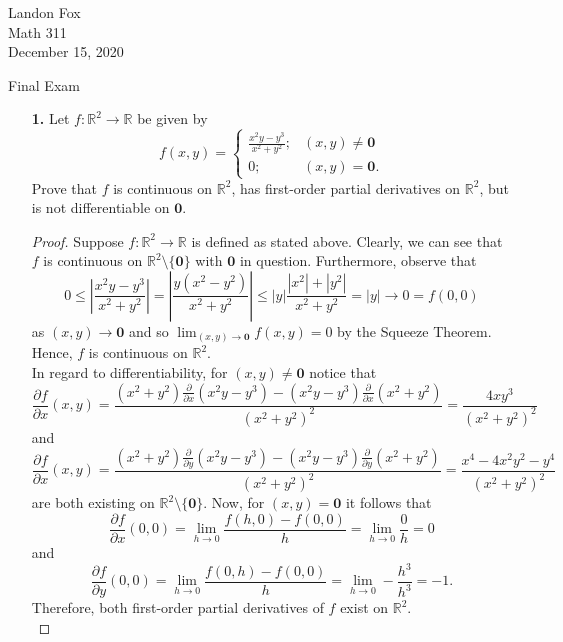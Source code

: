 \documentclass[ 12pt ]{article}
\begin{document}
\noindent Landon Fox \\
\noindent Math 311 \\
\noindent December 15, 2020

\begin{center}
	\Large Final Exam
\end{center}

\begin{enumerate}
	\item[\textbf{1.}] Let $f : \mathbb{R}^2 \to \mathbb{R}$ be given by \[ f(x, y) = \begin{cases} \frac{x^2y - y^3}{x^2 + y^2}; &(x, y) \neq \textbf{0} \\ 0; &(x, y) =
		\textbf{0}. \end{cases} \] Prove that $f$ is continuous on $\mathbb{R}^2$, has first-order partial derivatives on $\mathbb{R}^2$, but is not differentiable on
		$\textbf{0}$.

		\begin{proof}
			Suppose $f : \mathbb{R}^2 \to \mathbb{R}$ is defined as stated above. Clearly, we can see that $f$ is continuous on $\mathbb{R}^2 \setminus \{ \textbf{0} \}$ with
			$\textbf{0}$ in question. Furthermore, observe that $$0 \leq \left | \frac{x^2y - y^3}{x^2 + y^2} \right | = \left | \frac{y(x^2 - y^2)}{x^2 + y^2} \right |
			\leq |y| \frac{|x^2| + |y^2|}{x^2 + y^2} = |y| \to 0 = f(0, 0)$$ as $(x, y) \to \textbf{0}$ and so $\lim_{(x, y) \to \textbf{0}} f(x, y) = 0$ by the Squeeze
			Theorem. Hence, $f$ is continuous on $\mathbb{R}^2$. \\

			In regard to differentiability, for $(x, y) \neq \textbf{0}$ notice that $$\frac{\partial f}{\partial x}(x, y) = \frac{ (x^2 + y^2)\frac{\partial}{\partial x}
			(x^2y - y^3) - (x^2y - y^3)\frac{\partial}{\partial x}(x^2 + y^2)}{(x^2 + y^2)^2} = \frac{4xy^3}{(x^2 + y^2)^2}$$ and $$\frac{\partial f}{\partial x}(x, y) =
			\frac{ (x^2 + y^2)\frac{\partial}{\partial y}(x^2y - y^3) - (x^2y - y^3)\frac{\partial}{\partial y}(x^2 + y^2)}{(x^2 + y^2)^2} = \frac{x^4 - 4x^2y^2 - y^4}{(x^2 +
			y^2)^2}$$ are both existing on $\mathbb{R}^2 \setminus \{ \textbf{0} \}$. Now, for $(x, y) = \textbf{0}$ it follows that $$\frac{\partial f}{\partial x}(0, 0) =
			\lim_{h \to 0} \frac{f(h, 0) - f(0, 0)}{h} = \lim_{h \to 0} \frac{0}{h} = 0$$ and $$\frac{\partial f}{\partial y}(0, 0) = \lim_{h \to 0} \frac{f(0, h) -
			f(0, 0)}{h} = \lim_{h \to 0} -\frac{h^3}{h^3} = -1.$$ Therefore, both first-order partial derivatives of $f$ exist on $\mathbb{R}^2$. \\


\end{proof}
\end{enumerate}
\end{document}
